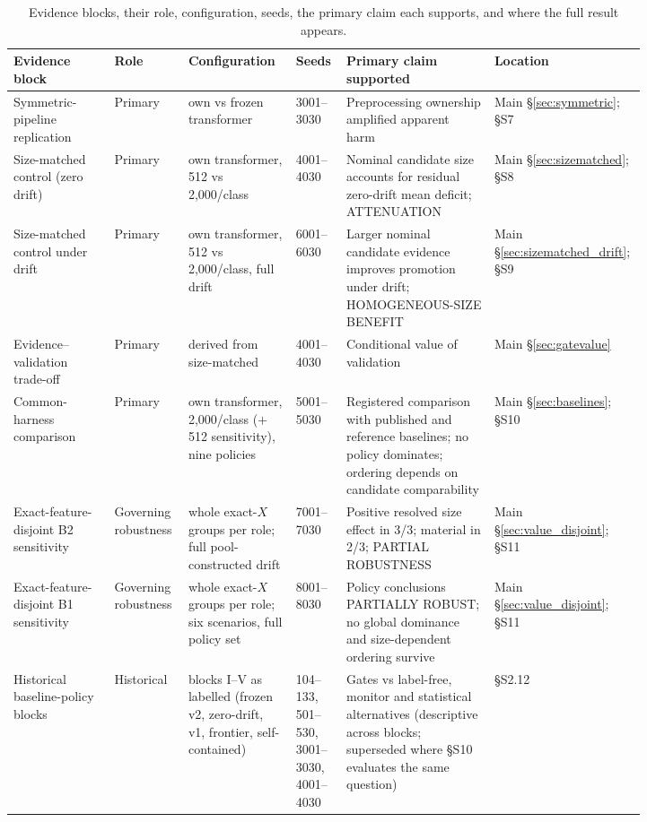 \documentclass[a4paper,11pt]{article}
\begin{document}
\begin{table}[h]
\centering
\caption{Evidence blocks, their role, configuration, seeds, the primary claim each supports, and where the full result appears.}
\label{tab:S0_provenance}
\scriptsize
\setlength{\tabcolsep}{4pt}
\begin{tabular}{p{0.155\linewidth} p{0.10\linewidth} p{0.165\linewidth} p{0.075\linewidth} p{0.225\linewidth} p{0.095\linewidth}}
\toprule
Evidence block & Role & Configuration & Seeds & Primary claim supported & Location \\
\midrule
Symmetric-pipeline replication & Primary & own vs frozen transformer & 3001--3030 & Preprocessing ownership amplified apparent harm & Main \S\ref{sec:symmetric}; \S S7 \\
Size-matched control (zero drift) & Primary & own transformer, 512 vs 2{,}000/class & 4001--4030 & Nominal candidate size accounts for residual zero-drift mean deficit; ATTENUATION & Main \S\ref{sec:sizematched}; \S S8 \\
Size-matched control under drift & Primary & own transformer, 512 vs 2{,}000/class, full drift & 6001--6030 & Larger nominal candidate evidence improves promotion under drift; HOMOGENEOUS-SIZE BENEFIT & Main \S\ref{sec:sizematched_drift}; \S S9 \\
Evidence--validation trade-off & Primary & derived from size-matched & 4001--4030 & Conditional value of validation & Main \S\ref{sec:gatevalue} \\
Common-harness comparison & Primary & own transformer, 2{,}000/class ($+$512 sensitivity), nine policies & 5001--5030 & Registered comparison with published and reference baselines; no policy dominates; ordering depends on candidate comparability & Main \S\ref{sec:baselines}; \S S10 \\
Exact-feature-disjoint B2 sensitivity & Governing robustness & whole exact-$X$ groups per role; full pool-constructed drift & 7001--7030 & Positive resolved size effect in 3/3; material in 2/3; PARTIAL ROBUSTNESS & Main \S\ref{sec:value_disjoint}; \S S11 \\
Exact-feature-disjoint B1 sensitivity & Governing robustness & whole exact-$X$ groups per role; six scenarios, full policy set & 8001--8030 & Policy conclusions PARTIALLY ROBUST; no global dominance and size-dependent ordering survive & Main \S\ref{sec:value_disjoint}; \S S11 \\
Historical baseline-policy blocks & Historical & blocks I--V as labelled (frozen v2, zero-drift, v1, frontier, self-contained) & 104--133, 501--530, 3001--3030, 4001--4030 & Gates vs label-free, monitor and statistical alternatives (descriptive across blocks; superseded where \S S10 evaluates the same question) & \S S2.12 \\

\end{tabular}
\end{table}
\end{document}
